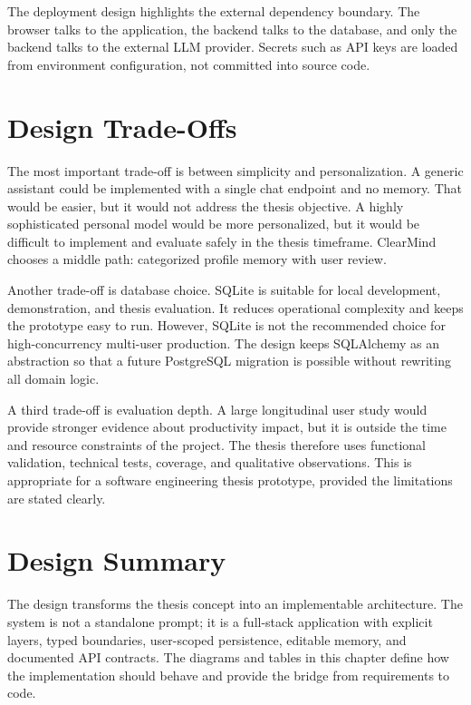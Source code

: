 
The deployment design highlights the external dependency boundary. The browser talks to the application, the backend talks to the database, and only the backend talks to the external LLM provider. Secrets such as API keys are loaded from environment configuration, not committed into source code.

\section{Design Trade-Offs}

The most important trade-off is between simplicity and personalization. A generic assistant could be implemented with a single chat endpoint and no memory. That would be easier, but it would not address the thesis objective. A highly sophisticated personal model would be more personalized, but it would be difficult to implement and evaluate safely in the thesis timeframe. ClearMind chooses a middle path: categorized profile memory with user review.

Another trade-off is database choice. SQLite is suitable for local development, demonstration, and thesis evaluation. It reduces operational complexity and keeps the prototype easy to run. However, SQLite is not the recommended choice for high-concurrency multi-user production. The design keeps SQLAlchemy as an abstraction so that a future PostgreSQL migration is possible without rewriting all domain logic.

A third trade-off is evaluation depth. A large longitudinal user study would provide stronger evidence about productivity impact, but it is outside the time and resource constraints of the project. The thesis therefore uses functional validation, technical tests, coverage, and qualitative observations. This is appropriate for a software engineering thesis prototype, provided the limitations are stated clearly.

\section{Design Summary}

The design transforms the thesis concept into an implementable architecture. The system is not a standalone prompt; it is a full-stack application with explicit layers, typed boundaries, user-scoped persistence, editable memory, and documented API contracts. The diagrams and tables in this chapter define how the implementation should behave and provide the bridge from requirements to code.
